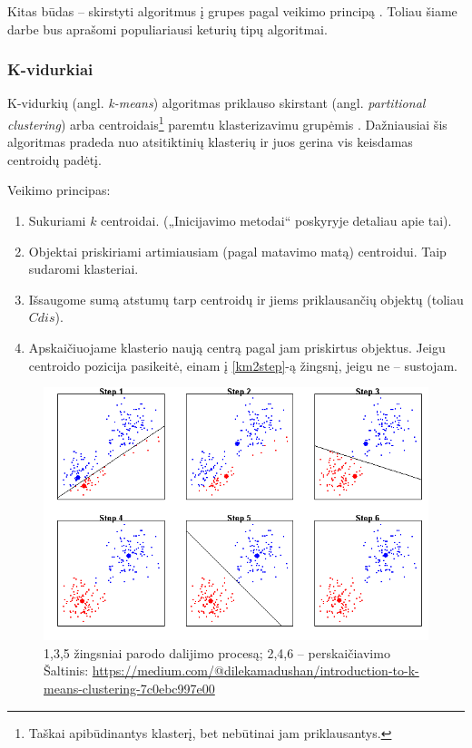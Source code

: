 \documentclass{VUMIFInfKursinis}
\newcommand{\ltang}[2]{#1 (angl. \textit{#2})}
\begin{document}
Kitas būdas – skirstyti algoritmus į grupes pagal veikimo principą \cite{kadhim2014text}.
Toliau šiame darbe bus aprašomi populiariausi keturių tipų algoritmai.






\subsubsection{K-vidurkiai}\label{km}

\ltang{K-vidurkių}{k-means} algoritmas priklauso \ltang{skirstant}{partitional clustering}
arba centroidais\footnote{Taškai
apibūdinantys klasterį, bet nebūtinai jam priklausantys.} paremtu
klasterizavimu grupėmis \cite{macqueen1967some}. Dažniausiai šis algoritmas pradeda nuo
atsitiktinių klasterių ir juos gerina vis keisdamas centroidų padėtį.

Veikimo principas:

\begin{enumerate}
\item
  Sukuriami $k$ centroidai. („Inicijavimo metodai“ poskyryje
  detaliau apie tai).
\item
  Objektai priskiriami artimiausiam (pagal matavimo matą) centroidui.
  Taip sudaromi klasteriai.\label{km2step}
\item
  Išsaugome sumą atstumų tarp centroidų ir jiems priklausančių objektų
  (toliau $Cdis$).
\item
  Apskaičiuojame klasterio naują centrą pagal jam priskirtus objektus.
  Jeigu centroido pozicija pasikeitė, einam į \ref{km2step}-ą žingsnį, jeigu ne –
  sustojam.
\end{enumerate}

\begin{figure}[H]
  \centering
  \includegraphics[scale=.5]{img/Kmean}
  \caption{1,3,5 žingsniai parodo dalijimo procesą; 2,4,6 – perskaičiavimo\\
           Šaltinis: \url{https://medium.com/@dilekamadushan/introduction-to-k-means-clustering-7c0ebc997e00}}
\end{figure}
\end{document}
